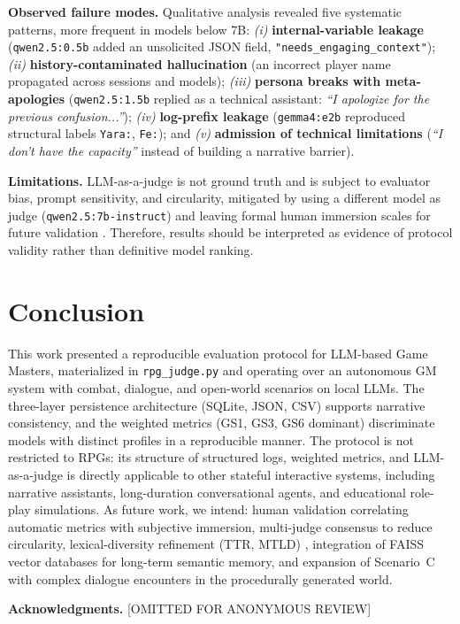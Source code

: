 \documentclass[12pt]{article}
\begin{document}
\textbf{Observed failure modes.} Qualitative analysis revealed five systematic patterns, more frequent in models below 7B: \textit{(i)} \textbf{internal-variable leakage} (\texttt{qwen2.5:0.5b} added an unsolicited JSON field, \texttt{"needs\_engaging\_context"}); \textit{(ii)} \textbf{history-contaminated hallucination} (an incorrect player name propagated across sessions and models); \textit{(iii)} \textbf{persona breaks with meta-apologies} (\texttt{qwen2.5:1.5b} replied as a technical assistant: \textit{``I apologize for the previous confusion...''}); \textit{(iv)} \textbf{log-prefix leakage} (\texttt{gemma4:e2b} reproduced structural labels \texttt{Yara:}, \texttt{Fe:}); and \textit{(v)} \textbf{admission of technical limitations} (\textit{``I don't have the capacity''} instead of building a narrative barrier).

\textbf{Limitations.} LLM-as-a-judge is not ground truth and is subject to evaluator bias, prompt sensitivity, and circularity, mitigated by using a different model as judge (\texttt{qwen2.5:7b-instruct}) and leaving formal human immersion scales for future validation \cite{zheng:2023}. Therefore, results should be interpreted as evidence of protocol validity rather than definitive model ranking.

\section{Conclusion}
\label{sec:conclusion}

This work presented a reproducible evaluation protocol for LLM-based Game Masters, materialized in \texttt{rpg\_judge.py} and operating over an autonomous GM system with combat, dialogue, and open-world scenarios on local LLMs. The three-layer persistence architecture (SQLite, JSON, CSV) supports narrative consistency, and the weighted metrics (GS1, GS3, GS6 dominant) discriminate models with distinct profiles in a reproducible manner. The protocol is not restricted to RPGs: its structure of structured logs, weighted metrics, and LLM-as-a-judge is directly applicable to other stateful interactive systems, including narrative assistants, long-duration conversational agents, and educational role-play simulations. As future work, we intend: human validation correlating automatic metrics with subjective immersion, multi-judge consensus to reduce circularity, lexical-diversity refinement (TTR, MTLD) \cite{reviriego:2024}, integration of FAISS vector databases for long-term semantic memory, and expansion of Scenario~C with complex dialogue encounters in the procedurally generated world.

\textbf{Acknowledgments.} [OMITTED FOR ANONYMOUS REVIEW]



\end{document}
